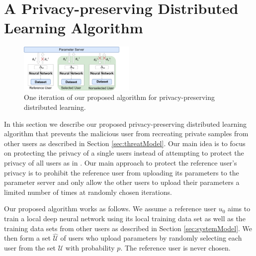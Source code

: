 \documentclass[conference]{IEEEtran}
\begin{document}

\section{A Privacy-preserving Distributed Learning Algorithm}
\begin{figure}[t]
\centering
\includegraphics[width=0.5\textwidth, keepaspectratio]{OurHighLevelApproach.pdf}
\caption{One iteration of our proposed algorithm for privacy-preserving distributed learning.}
\label{fig:HighLevel}
\end{figure}
In this section we describe our proposed privacy-preserving distributed learning algorithm that prevents the malicious user from recreating
private samples from other users as described in Section \ref{sec:threatModel}. 
Our main idea is to focus on protecting the privacy of a single users instead of attempting to protect the privacy of all users as in 
\cite{shokri2015privacy}. Our main approach to protect the reference user's privacy is to prohibit the reference user
from uploading its parameters to the  parameter server and only allow the other users to upload their parameters a limited number of
times at randomly chosen iterations.


Our proposed algorithm works as follows. 
We assume a reference user $u_0$ aims to train a local deep neural network using its local training data set as well as the
training data sets from other users as described in Section \ref{sec:systemModel}.  We then form a set $\hat{\mathcal{{U}}}$ of
users who upload parameters by randomly selecting each user from the set $\mathcal{U}$ with probability $p$. 
The reference user is never chosen.
\end{document}
